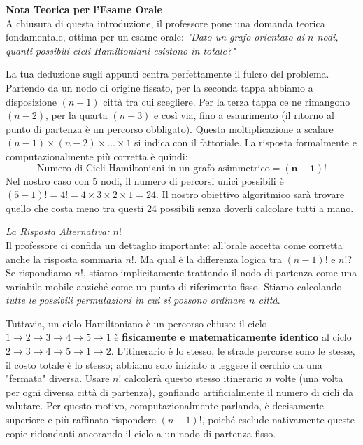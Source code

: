 \documentclass[12pt, a4paper]{article}
\begin{document}
	\vspace{0.4cm}
	\textbf{Nota Teorica per l'Esame Orale}\\
	A chiusura di questa introduzione, il professore pone una domanda teorica fondamentale, ottima per un esame orale: \textit{"Dato un grafo orientato di $n$ nodi, quanti possibili cicli Hamiltoniani esistono in totale?"}
	
	La tua deduzione sugli appunti centra perfettamente il fulcro del problema. Partendo da un nodo di origine fissato, per la seconda tappa abbiamo a disposizione $(n-1)$ città tra cui scegliere. Per la terza tappa ce ne rimangono $(n-2)$, per la quarta $(n-3)$ e così via, fino a esaurimento (il ritorno al punto di partenza è un percorso obbligato). 
	Questa moltiplicazione a scalare $(n-1) \times (n-2) \times \dots \times 1$ si indica con il fattoriale. La risposta formalmente e computazionalmente più corretta è quindi:
	\[
	\text{Numero di Cicli Hamiltoniani in un grafo asimmetrico} = \mathbf{(n-1)!}
	\]
	Nel nostro caso con 5 nodi, il numero di percorsi unici possibili è $(5-1)! = 4! = 4 \times 3 \times 2 \times 1 = 24$. Il nostro obiettivo algoritmico sarà trovare quello che costa meno tra questi 24 possibili senza doverli calcolare tutti a mano.
	
	\textit{La Risposta Alternativa: $n!$}\\
	Il professore ci confida un dettaglio importante: all'orale accetta come corretta anche la risposta sommaria \textbf{$n!$}. Ma qual è la differenza logica tra $(n-1)!$ e $n!$?
	Se rispondiamo $n!$, stiamo implicitamente trattando il nodo di partenza come una variabile mobile anziché come un punto di riferimento fisso. Stiamo calcolando \textit{tutte le possibili permutazioni in cui si possono ordinare $n$ città}. 
	
	Tuttavia, un ciclo Hamiltoniano è un percorso chiuso: il ciclo $1 \rightarrow 2 \rightarrow 3 \rightarrow 4 \rightarrow 5 \rightarrow 1$ è \textbf{fisicamente e matematicamente identico} al ciclo $2 \rightarrow 3 \rightarrow 4 \rightarrow 5 \rightarrow 1 \rightarrow 2$. L'itinerario è lo stesso, le strade percorse sono le stesse, il costo totale è lo stesso; abbiamo solo iniziato a leggere il cerchio da una "fermata" diversa. 
	Usare $n!$ calcolerà questo stesso itinerario $n$ volte (una volta per ogni diversa città di partenza), gonfiando artificialmente il numero di cicli da valutare. Per questo motivo, computazionalmente parlando, è decisamente superiore e più raffinato rispondere $(n-1)!$, poiché esclude nativamente queste copie ridondanti ancorando il ciclo a un nodo di partenza fisso.
	
\end{document}
